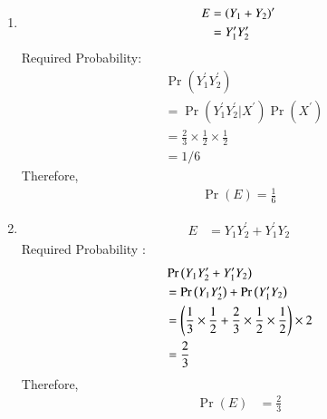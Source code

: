 \documentclass[journal,12pt,twocolumn]{IEEEtran}
\providecommand{\pr}[1]{\ensuremath{\Pr\left(#1\right)}}
\begin{document}
\begin{enumerate}

\item 
\begin{align}
E &= \left(Y_1+Y_2\right)^\prime  \\
&= Y_1^\prime Y_2^\prime
\end{align}
Required Probability:
\begin{align}  
&\pr{Y_1^\prime Y_2^\prime} \\ \nonumber
&=\pr{Y_1^\prime Y_2^\prime | X^\prime}\pr{X^\prime} \\ \nonumber
&= \frac{2}{3}\times\frac{1}{2}\times\frac{1}{2} \\ \label{eq:1}
&= 1/6 
\end{align}
Therefore,
\begin{align}
\pr{E} = \frac{1}{6} 
\end{align}
\item 
\begin{align}
E&= Y_1 Y_2^\prime + Y_1^\prime Y_2
\end{align}
Required Probability : 
\begin{align}
&\pr{Y_1 Y_2^\prime + Y_1^\prime Y_2} \\
&=\pr{Y_1 Y_2^\prime} + \pr{Y_1^\prime Y_2} \\
&=\brak{\frac{1}{3}\times\frac{1}{2} + \frac{2}{3}\times\frac{1}{2}\times\frac{1}{2}}\times 2 \\
&=\frac{2}{3}
\end{align}
Therefore,
\begin{align}
\pr{E} &= \frac{2}{3}
\end{align}
\end{enumerate}
\end{document}
